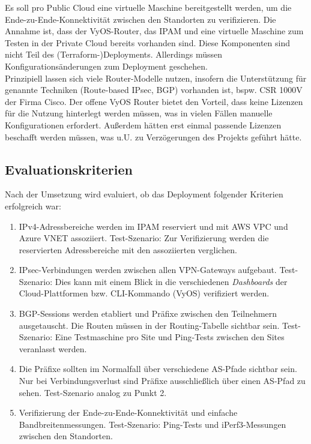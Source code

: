 Es soll pro Public Cloud eine virtuelle Maschine bereitgestellt werden, um die Ende-zu-Ende-Konnektivität zwischen den Standorten zu verifizieren.
Die Annahme ist, dass der VyOS-Router, das IPAM und eine virtuelle Maschine zum Testen in der Private Cloud bereits vorhanden sind. Diese Komponenten sind nicht Teil des (Terraform-)Deployments. Allerdings müssen Konfigurationsänderungen zum Deployment geschehen.\\
Prinzipiell lassen sich viele Router-Modelle nutzen, insofern die Unterstützung für genannte Techniken (Route-based IPsec, BGP) vorhanden ist, bspw. CSR 1000V der Firma Cisco\cite{Durai2016}. Der offene VyOS Router bietet den Vorteil, dass keine Lizenzen für die Nutzung hinterlegt werden müssen, was in vielen Fällen manuelle Konfigurationen erfordert. Außerdem hätten erst einmal passende Lizenzen beschafft werden müssen, was u.U. zu Verzögerungen des Projekts geführt hätte.





\subsection{Evaluationskriterien}\label{eval-kriterien-uc1}
Nach der Umsetzung wird evaluiert, ob das Deployment folgender Kriterien erfolgreich war:
\begin{enumerate}
    \item IPv4-Adressbereiche werden im IPAM reserviert und mit AWS VPC und Azure VNET assoziiert. Test-Szenario: Zur Verifizierung werden die reservierten Adressbereiche mit den assoziierten verglichen.
    \item IPsec-Verbindungen werden zwischen allen VPN-Gateways aufgebaut. Test-Szenario: Dies kann mit einem Blick in die verschiedenen \textit{Dashboards} der Cloud-Plattformen bzw. CLI-Kommando (VyOS) verifiziert werden.
    \item BGP-Sessions werden etabliert und Präfixe zwischen den Teilnehmern ausgetauscht. Die Routen müssen in der Routing-Tabelle sichtbar sein. Test-Szenario: Eine Testmaschine pro Site und Ping-Tests zwischen den Sites veranlasst werden.
    \item Die Präfixe sollten im Normalfall über verschiedene AS-Pfade sichtbar sein. Nur bei Verbindungsverlust sind Präfixe ausschließlich über einen AS-Pfad zu sehen. Test-Szenario analog zu Punkt 2.
    \item Verifizierung der Ende-zu-Ende-Konnektivität und einfache Bandbreitenmessungen. Test-Szenario: Ping-Tests und iPerf3-Messungen zwischen den Standorten.
\end{enumerate}